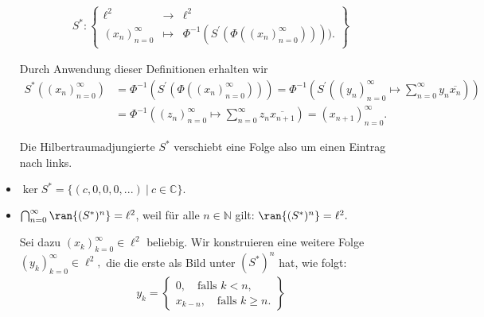 \begin{solution}
\begin{itemize}
      \begin{align*}
        S^*: \begin{Bmatrix}
       \ell^2 & \rightarrow & \ell^2 \\
       (x_n)_{n=0}^\infty & \mapsto & \Phi^{-1}(S^\prime(\Phi((x_n)_{n=0}^\infty)))).
        \end{Bmatrix}
      \end{align*}

       Durch Anwendung dieser Definitionen erhalten wir
       \begin{align*}
           S^*((x_n)_{n=0}^\infty) &= \Phi^{-1}(S^\prime(\Phi((x_n)_{n=0}^\infty))) =
           \Phi^{-1}\left(S^\prime\left( (y_n)_{n=0}^\infty \mapsto \sum_{n=0}^\infty y_n \overline{x_n}\right)\right) \\
           &= \Phi^{-1}\left((z_n)_{n=0}^\infty \mapsto \sum_{n=0}^\infty z_n \overline{x_{n+1}}\right) = (x_{n+1})_{n=0}^\infty.
       \end{align*}

       Die Hilbertraumadjungierte $S^*$ verschiebt eine Folge also um einen Eintrag nach links.

      \item $\ker{S^*} = \{(c, 0, 0, 0, ...)~|~c \in \mathbb{C}\}.$
      \item $\bigcap_{n=0}^\infty \ran{(S^*)^n} = \ell^2$, weil für alle $n \in \mathbb{N}$ gilt: $\ran{(S^*)^n} = \ell^2.$

      Sei dazu $(x_k)_{k=0}^\infty \in \ell^2$ beliebig. Wir konstruieren eine weitere Folge $(y_k)_{k=0}^\infty \in \ell^2,$ die die erste als Bild unter $(S^*)^n$ hat, wie folgt:
      \begin{align*}
       y_k = \left\{\begin{array}{ll}
       0, \text{~~~falls~} k < n, \\
       x_{k-n}, \text{~~~falls~} k \geq n.
       \end{array}\right\}
      \end{align*}
  \end{itemize}
\end{solution}
